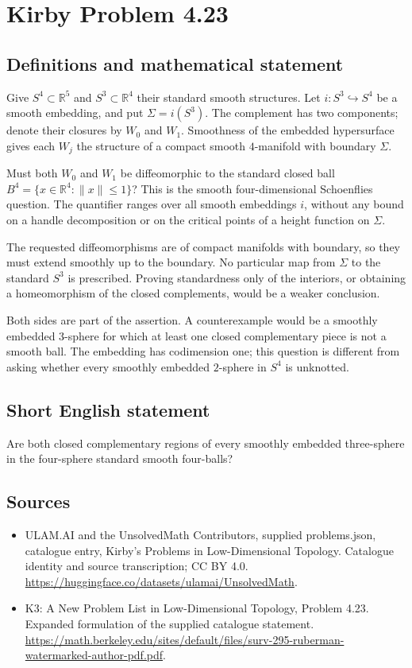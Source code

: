\documentclass[11pt,a4paper]{article}
\begin{document}
\section*{Kirby Problem 4.23}\label{statement}

\subsection{Definitions and mathematical statement}
Give $S^4\subset\mathbb R^5$ and $S^3\subset\mathbb R^4$ their standard
smooth structures. Let $i:S^3\hookrightarrow S^4$ be a smooth embedding,
and put $\Sigma=i(S^3)$. The complement has two components; denote
their closures by $W_0$ and $W_1$. Smoothness of the embedded
hypersurface gives each $W_j$ the structure of a compact smooth
$4$-manifold with boundary $\Sigma$.

Must both $W_0$ and $W_1$ be diffeomorphic to the standard closed
ball $B^4=\{x\in\mathbb R^4:\|x\|\le1\}$? This is the smooth
four-dimensional Schoenflies question. The quantifier ranges over all
smooth embeddings $i$, without any bound on a handle decomposition
or on the critical points of a height function on $\Sigma$.

The requested diffeomorphisms are of compact manifolds with boundary,
so they must extend smoothly up to the boundary. No particular map
from $\Sigma$ to the standard $S^3$ is prescribed. Proving standardness
only of the interiors, or obtaining a homeomorphism of the closed
complements, would be a weaker conclusion.

Both sides are part of the assertion. A counterexample would be a
smoothly embedded $3$-sphere for which at least one closed complementary
piece is not a smooth ball. The embedding has codimension one; this
question is different from asking whether every smoothly embedded
$2$-sphere in $S^4$ is unknotted.
\subsection{Short English statement}
Are both closed complementary regions of every smoothly embedded three-sphere in the four-sphere standard smooth four-balls?
\subsection{Sources}
\begin{itemize}
\item[S1] ULAM.AI and the UnsolvedMath Contributors, supplied problems.json, catalogue entry, Kirby's Problems in Low-Dimensional Topology. Catalogue identity and source transcription; CC BY 4.0.
\url{https://huggingface.co/datasets/ulamai/UnsolvedMath}.
\item[S2] K3: A New Problem List in Low-Dimensional Topology, Problem 4.23. Expanded formulation of the supplied catalogue statement.
\url{https://math.berkeley.edu/sites/default/files/surv-295-ruberman-watermarked-author-pdf.pdf}.
\end{itemize}
\end{document}
